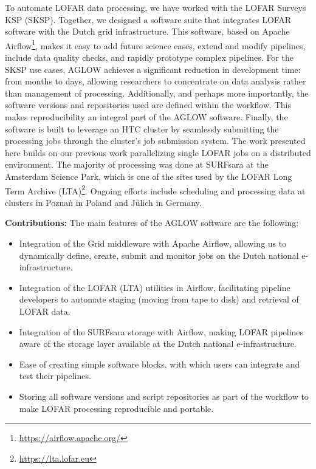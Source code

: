To automate LOFAR data processing, we have worked with the LOFAR Surveys KSP (SKSP). Together, we designed a software suite that integrates LOFAR software\cite{cookbook} with the Dutch grid infrastructure\cite{dutchinfra}. This software, based on Apache Airflow\footnote{\url{https://airflow.apache.org/}}, makes it easy to add future science cases, extend and modify pipelines, include data quality checks, and rapidly prototype complex pipelines.  For the SKSP use cases, AGLOW achieves a significant reduction in development time: from months to days, allowing researchers to concentrate on data analysis rather than management of processing.  Additionally, and perhaps more importantly, the software versions and repositories used are defined within the workflow. This makes reproducibility an integral part of the AGLOW software.  Finally, the software is built to  leverage an HTC cluster by seamlessly submitting the processing jobs through the cluster's job submission system\cite{glite}. The work presented here builds on our previous work parallelizing single LOFAR jobs\cite{mechev} on a distributed environment. The majority of processing was done at SURFsara at the Amsterdam Science Park\cite{SurfSara}, which is one of the sites used by the LOFAR Long Term Archive (LTA)\footnote{\url{https://lta.lofar.eu}}. Ongoing efforts include scheduling and processing data at clusters in Pozna\`{n} in Poland and J\"{u}lich in Germany. 

\textbf{Contributions:}
The main features of the AGLOW software are the following:
\begin{itemize}
\item Integration of the Grid middleware with Apache Airflow, allowing us to dynamically define, create, submit and monitor jobs on the Dutch national e-infrastructure.
\item Integration of the LOFAR (LTA) utilities in  Airflow, facilitating pipeline developers to automate staging (moving from tape to disk) and retrieval of LOFAR data.
\item Integration of the SURFsara storage with Airflow, making LOFAR pipelines aware of the storage layer available at the Dutch national e-infrastructure.  
\item Ease of creating simple software blocks, with which users can integrate and test their pipelines. 
\item Storing all software versions and script repositories as part of the workflow to make LOFAR processing reproducible and portable. 
\end{itemize}

